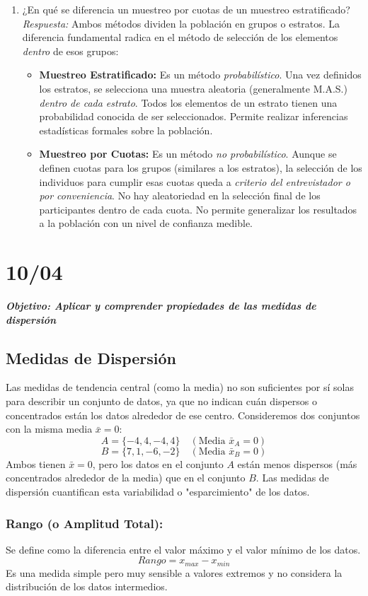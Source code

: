 \documentclass[12pt, letterpaper]{article}
\begin{document}
\begin{enumerate}
    \item ¿En qué se diferencia un muestreo por cuotas de un muestreo estratificado?
    \textit{Respuesta:} Ambos métodos dividen la población en grupos o estratos. La diferencia fundamental radica en el método de selección de los elementos \textit{dentro} de esos grupos:
    \begin{itemize}
        \item \textbf{Muestreo Estratificado:} Es un método \textit{probabilístico}. Una vez definidos los estratos, se selecciona una muestra aleatoria (generalmente M.A.S.) \textit{dentro de cada estrato}. Todos los elementos de un estrato tienen una probabilidad conocida de ser seleccionados. Permite realizar inferencias estadísticas formales sobre la población.
        \item \textbf{Muestreo por Cuotas:} Es un método \textit{no probabilístico}. Aunque se definen cuotas para los grupos (similares a los estratos), la selección de los individuos para cumplir esas cuotas queda a \textit{criterio del entrevistador o por conveniencia}. No hay aleatoriedad en la selección final de los participantes dentro de cada cuota. No permite generalizar los resultados a la población con un nivel de confianza medible.
    \end{itemize}
\end{enumerate}
\newpage

\section{10/04}
\textbf{\textit{Objetivo: Aplicar y comprender propiedades de las medidas de dispersión}}
\subsection{Medidas de Dispersión}
Las medidas de tendencia central (como la media) no son suficientes por sí solas para describir un conjunto de datos, ya que no indican cuán dispersos o concentrados están los datos alrededor de ese centro. Consideremos dos conjuntos con la misma media $\bar{x}=0$:
\[ A = \{-4, 4, -4, 4\} \quad (\text{Media } \bar{x}_A = 0) \]
\[ B = \{7, 1, -6, -2\} \quad (\text{Media } \bar{x}_B = 0) \]
Ambos tienen $\bar{x}=0$, pero los datos en el conjunto $A$ están menos dispersos (más concentrados alrededor de la media) que en el conjunto $B$. Las medidas de dispersión cuantifican esta variabilidad o "esparcimiento" de los datos.

\subsubsection{Rango (o Amplitud Total):}
Se define como la diferencia entre el valor máximo y el valor mínimo de los datos.
\[ Rango = x_{max} - x_{min} \]
Es una medida simple pero muy sensible a valores extremos y no considera la distribución de los datos intermedios.
\end{document}
